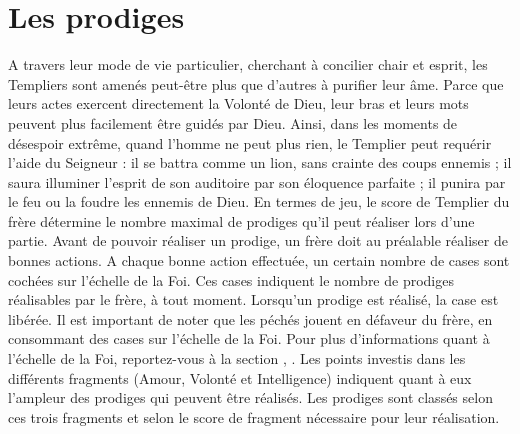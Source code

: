 \section{Les prodiges}\label{sec:prodiges}
    A travers leur mode de vie particulier, cherchant à concilier chair et
    esprit, les Templiers sont amenés peut-être plus que d'autres à purifier
    leur âme. Parce que leurs actes exercent directement la Volonté de Dieu,
    leur bras et leurs mots peuvent plus facilement être guidés par Dieu. Ainsi, dans les moments de désespoir extrême, quand l'homme ne peut plus rien, le Templier peut requérir l'aide du Seigneur : il se battra comme un lion, sans crainte des coups ennemis ; il saura illuminer l'esprit de son auditoire par son éloquence parfaite ; il punira par le feu ou la foudre les ennemis de Dieu.
    En termes de jeu, le score de Templier du frère détermine le nombre maximal de prodiges qu'il peut réaliser lors d'une partie. Avant de pouvoir réaliser un prodige, un frère doit au préalable réaliser de bonnes actions. A chaque bonne action effectuée, un certain nombre de cases sont cochées sur l'échelle de la Foi. Ces cases indiquent le nombre de prodiges réalisables par le frère, à tout moment. Lorsqu'un prodige est réalisé, la case est libérée. Il est important de noter que les péchés jouent en défaveur du frère, en consommant des cases sur l'échelle de la Foi. Pour plus d'informations quant à l'échelle de la Foi, reportez-vous à la section , . Les points investis dans les différents fragments (Amour, Volonté et Intelligence) indiquent quant à eux l'ampleur des prodiges qui peuvent être réalisés. Les prodiges sont classés selon ces trois fragments et selon le score de fragment nécessaire pour leur réalisation.

